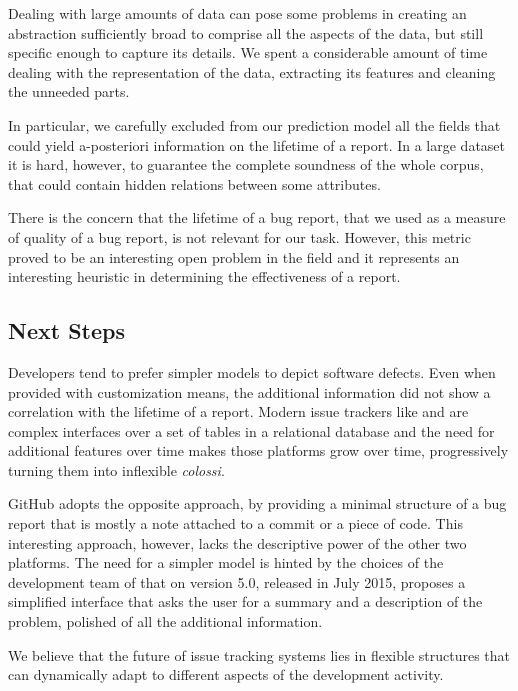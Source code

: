 Dealing with large amounts of data can pose some problems in creating an abstraction sufficiently broad to comprise all the aspects of the data, but still specific enough to capture its details.
We spent a considerable amount of time dealing with the representation of the data, extracting its features and cleaning the unneeded parts.

In particular, we carefully excluded from our prediction model all the fields that could yield a-posteriori information on the lifetime of a report.
In a large dataset it is hard, however, to guarantee the complete soundness of the whole corpus, that could contain hidden relations between some attributes.

There is the concern that the lifetime of a bug report, that we used as a measure of quality of a bug report, is not relevant for our task.
However, this metric proved to be an interesting open problem in the field and it represents an interesting heuristic in determining the effectiveness of a report.


\subsection{Next Steps}

Developers tend to prefer simpler models to depict software defects.
Even when provided with customization means, the additional information did not show a correlation with the lifetime of a report.
Modern issue trackers like \jira and \bzilla are complex interfaces over a set of tables in a relational database and the need for additional features over time makes those platforms grow over time, progressively turning them into inflexible \emph{colossi}.

GitHub adopts the opposite approach, by providing a minimal structure of a bug report that is mostly a note attached to a commit or a piece of code.
This interesting approach, however, lacks the descriptive power of the other two platforms.
The need for a simpler model is hinted by the choices of the development team of \bzilla that on version 5.0, released in July 2015, proposes a simplified interface that asks the user for a summary and a description of the problem, polished of all the additional information.

We believe that the future of issue tracking systems lies in flexible structures that can dynamically adapt to different aspects of the development activity.


